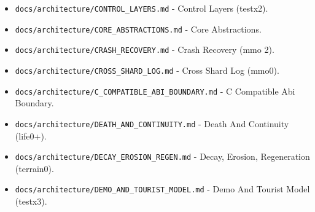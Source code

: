 \documentclass[9pt,a4paper,openany]{book}
\begin{document}
\begin{itemize}
\item \texttt{docs/\allowbreak{}architecture/\allowbreak{}CONTROL\_\allowbreak{}LAYERS.\allowbreak{}md} -\allowbreak{} Control Layers (testx2).\allowbreak{}
\end{itemize}

\begin{itemize}
\item \texttt{docs/\allowbreak{}architecture/\allowbreak{}CORE\_\allowbreak{}ABSTRACTIONS.\allowbreak{}md} -\allowbreak{} Core Abstractions.\allowbreak{}
\end{itemize}

\begin{itemize}
\item \texttt{docs/\allowbreak{}architecture/\allowbreak{}CRASH\_\allowbreak{}RECOVERY.\allowbreak{}md} -\allowbreak{} Crash Recovery (mmo 2).\allowbreak{}
\end{itemize}

\begin{itemize}
\item \texttt{docs/\allowbreak{}architecture/\allowbreak{}CROSS\_\allowbreak{}SHARD\_\allowbreak{}LOG.\allowbreak{}md} -\allowbreak{} Cross Shard Log (mmo0).\allowbreak{}
\end{itemize}

\begin{itemize}
\item \texttt{docs/\allowbreak{}architecture/\allowbreak{}C\_\allowbreak{}COMPATIBLE\_\allowbreak{}ABI\_\allowbreak{}BOUNDARY.\allowbreak{}md} -\allowbreak{} C Compatible Abi Boundary.\allowbreak{}
\end{itemize}

\begin{itemize}
\item \texttt{docs/\allowbreak{}architecture/\allowbreak{}DEATH\_\allowbreak{}AND\_\allowbreak{}CONTINUITY.\allowbreak{}md} -\allowbreak{} Death And Continuity (life0+).\allowbreak{}
\end{itemize}

\begin{itemize}
\item \texttt{docs/\allowbreak{}architecture/\allowbreak{}DECAY\_\allowbreak{}EROSION\_\allowbreak{}REGEN.\allowbreak{}md} -\allowbreak{} Decay, Erosion, Regeneration (terrain0).\allowbreak{}
\end{itemize}

\begin{itemize}
\item \texttt{docs/\allowbreak{}architecture/\allowbreak{}DEMO\_\allowbreak{}AND\_\allowbreak{}TOURIST\_\allowbreak{}MODEL.\allowbreak{}md} -\allowbreak{} Demo And Tourist Model (testx3).\allowbreak{}
\end{itemize}
\end{document}
